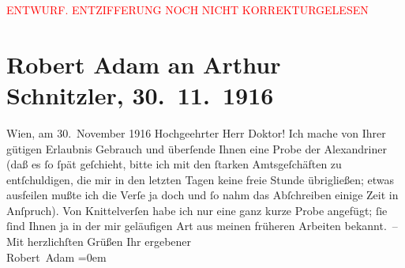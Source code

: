 
\begin{center}
            \textcolor{red}{ENTWURF. ENTZIFFERUNG NOCH NICHT KORREKTURGELESEN}
                      \end{center}
            
               \section[Robert Adam an Arthur Schnitzler, 30. 11. 1916]{ Robert Adam an Arthur Schnitzler, 30. 11. 1916}\nopagebreak{}\rehead{ }\begin{ledgroupsized}[t]{13cm}\normalsize\beginnumbering{} \toendnotes[C]{\smallbreak\pagebreak[2]} 
\pstart
           \raggedleft{}{\pb}Wien, am 30. November 1916\pend
           \pstart{}Hochgeehrter Herr Doktor!\pend\pstart
           Ich mache von Ihrer gütigen Erlaubnis Gebrauch und überſende Ihnen eine Probe der
                    Alexandriner (daß es ſo ſpät geſchieht, bitte ich mit den ſtarken Amtsgeſchäften
                    zu entſchuldigen, die mir in den letzten Tagen keine freie Stunde übrigließen;
                    etwas ausfeilen mußte ich die Verſe ja doch und ſo nahm das Abſchreiben einige
                    Zeit in Anſpruch). Von Knittelverſen habe ich nur eine ganz kurze Probe
                    angefügt; ſie ſind Ihnen ja in der mir geläufi{\pb}gen Art aus meinen früheren Arbeiten bekannt. –\pend
           \pstart
           Mit herzlichſten Grüßen Ihr\pend
           \pstart
           ergebener{\\[\baselineskip]}\spacefill\mbox{Robert Adam}\pend
           \leftskip=0em{}\endnumbering{}\end{ledgroupsized}  \newcommand{\dateiname}{L02248}\newcommand{\titel}{Robert Adam an Arthur Schnitzler, 30. 11. 1916}\newcommand{\editorInnen}{Martin Anton Müller und Gerd-Hermann Susen}
      